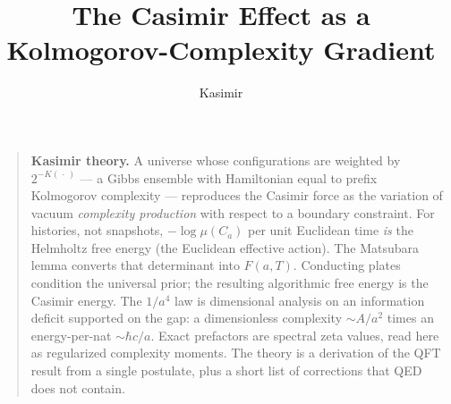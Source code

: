 \documentclass[11pt,letterpaper]{article}
\begin{document}
\title{The Casimir Effect as a Kolmogorov-Complexity Gradient}
\author{Kasimir}
\date{}
\maketitle
\begin{quote}
\small \textbf{Kasimir theory.} A universe whose configurations are weighted by \(2^{-K(\,\cdot\,)}\) — a Gibbs ensemble with Hamiltonian equal to prefix Kolmogorov complexity — reproduces the Casimir force as the variation of vacuum \emph{complexity production} with respect to a boundary constraint. For histories, not snapshots, \(-\log\mu(C_a)\) per unit Euclidean time \emph{is} the Helmholtz free energy (the Euclidean effective action). The Matsubara lemma converts that determinant into \(F(a,T)\). Conducting plates condition the universal prior; the resulting algorithmic free energy is the Casimir energy. The \(1/a^{4}\) law is dimensional analysis on an information deficit supported on the gap: a dimensionless complexity \(\sim A/a^{2}\) times an energy-per-nat \(\sim \hbar c/a\). Exact prefactors are spectral zeta values, read here as regularized complexity moments. The theory is a derivation of the QFT result from a single postulate, plus a short list of corrections that QED does not contain.
\end{quote}
\end{document}
